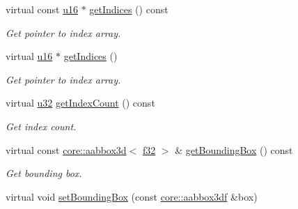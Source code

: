 \begin{DoxyCompactItemize}
virtual const \hyperlink{namespaceirr_ae9f8ec82692ad3b83c21f555bfa70bcc}{u16} $\ast$ \hyperlink{structirr_1_1scene_1_1SSkinMeshBuffer_ac5f16b3fca6454afe01939a2c1e23d08}{get\+Indices} () const
\begin{DoxyCompactList}\small\item\em Get pointer to index array. \end{DoxyCompactList}\item 
\mbox{\label{structirr_1_1scene_1_1SSkinMeshBuffer_ada6af60ed1545fd0b3372ddbb71ada5e}} 
virtual \hyperlink{namespaceirr_ae9f8ec82692ad3b83c21f555bfa70bcc}{u16} $\ast$ \hyperlink{structirr_1_1scene_1_1SSkinMeshBuffer_ada6af60ed1545fd0b3372ddbb71ada5e}{get\+Indices} ()
\begin{DoxyCompactList}\small\item\em Get pointer to index array. \end{DoxyCompactList}\item 
\mbox{\label{structirr_1_1scene_1_1SSkinMeshBuffer_adc00b4ce3b46d952575203c6e275e592}} 
virtual \hyperlink{namespaceirr_a0416a53257075833e7002efd0a18e804}{u32} \hyperlink{structirr_1_1scene_1_1SSkinMeshBuffer_adc00b4ce3b46d952575203c6e275e592}{get\+Index\+Count} () const
\begin{DoxyCompactList}\small\item\em Get index count. \end{DoxyCompactList}\item 
\mbox{\label{structirr_1_1scene_1_1SSkinMeshBuffer_a350535b406a7607bd392d07e5c3f9401}} 
virtual const \hyperlink{classirr_1_1core_1_1aabbox3d}{core\+::aabbox3d}$<$ \hyperlink{namespaceirr_a0277be98d67dc26ff93b1a6a1d086b07}{f32} $>$ \& \hyperlink{structirr_1_1scene_1_1SSkinMeshBuffer_a350535b406a7607bd392d07e5c3f9401}{get\+Bounding\+Box} () const
\begin{DoxyCompactList}\small\item\em Get bounding box. \end{DoxyCompactList}\item 
\mbox{\label{structirr_1_1scene_1_1SSkinMeshBuffer_ab4d3b6c78a4a3cfe368af4c89350497f}} 
virtual void \hyperlink{structirr_1_1scene_1_1SSkinMeshBuffer_ab4d3b6c78a4a3cfe368af4c89350497f}{set\+Bounding\+Box} (const \hyperlink{namespaceirr_1_1core_adfc8fa01b30044c55f3332a1d6c1aa19}{core\+::aabbox3df} \&box)

\end{DoxyCompactItemize}
